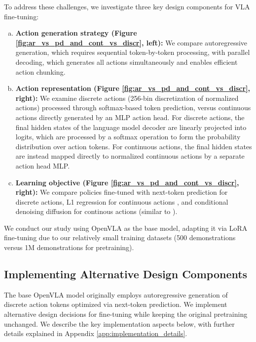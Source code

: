 \documentclass[conference]{IEEEtran}
\begin{document}
To address these challenges, we investigate three key design components for VLA fine-tuning:
\begin{enumerate}[(a)]
    \item \textbf{Action generation strategy (Figure \ref{fig:ar_vs_pd_and_cont_vs_discr}, left):} We compare autoregressive generation, which requires sequential token-by-token processing, with parallel decoding, which generates all actions simultaneously and enables efficient action chunking.

    \item \textbf{Action representation (Figure \ref{fig:ar_vs_pd_and_cont_vs_discr}, right):} We examine discrete actions (256-bin discretization of normalized actions) processed through softmax-based token prediction, versus continuous actions directly generated by an MLP action head. For discrete actions, the final hidden states of the language model decoder are linearly projected into logits, which are processed by a softmax operation to form the probability distribution over action tokens. For continuous actions, the final hidden states are instead mapped directly to normalized continuous actions by a separate action head MLP.
    
    \item \textbf{Learning objective (Figure \ref{fig:ar_vs_pd_and_cont_vs_discr}, right):} We compare policies fine-tuned with next-token prediction for discrete actions, L1 regression for continuous actions \citep{zhao2023learning}, and conditional denoising diffusion \citep{chi2023diffusion} for continous actions  (similar to \citet{chi2023diffusion}).
\end{enumerate}

We conduct our study using OpenVLA \citep{kim2024openvla} as the base model, adapting it via LoRA fine-tuning \citep{hu2021lora} due to our relatively small training datasets (500 demonstrations versus 1M demonstrations for pretraining).


\subsection{Implementing Alternative Design Components}
\label{sec:implementing_designs}

The base OpenVLA model originally employs autoregressive generation of discrete action tokens optimized via next-token prediction. We implement alternative design decisions for fine-tuning while keeping the original pretraining unchanged. We describe the key implementation aspects below, with further details explained in Appendix \ref{app:implementation_details}.
\end{document}
